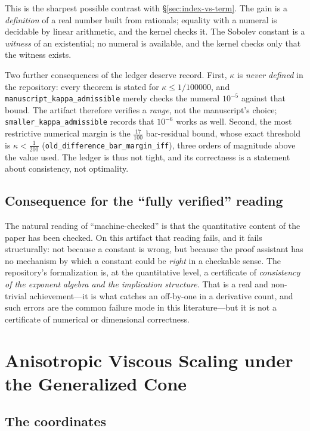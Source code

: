 \documentclass[11pt]{article}
\newcommand{\ct}[1]{\texttt{#1}}
\theoremstyle{plain}
\theoremstyle{definition}
\theoremstyle{remark}
\begin{document}
This is the sharpest possible contrast with \S\ref{sec:index-vs-term}. The gain
is a \emph{definition} of a real number built from rationals; equality with a
numeral is decidable by linear arithmetic, and the kernel checks it. The Sobolev
constant is a \emph{witness} of an existential; no numeral is available, and the
kernel checks only that the witness exists.

Two further consequences of the ledger deserve record. First, $\kappa$ is
\emph{never defined} in the repository: every theorem is stated for
$\kappa\le1/100000$, and \ct{manuscript\_kappa\_admissible} merely checks the
numeral $10^{-5}$ against that bound. The artifact therefore verifies a
\emph{range}, not the manuscript's choice; \ct{smaller\_kappa\_admissible}
records that $10^{-6}$ works as well. Second, the most restrictive numerical
margin is the $\tfrac{17}{100}$ bar-residual bound, whose exact threshold is
$\kappa<\tfrac1{200}$ (\ct{old\_difference\_bar\_margin\_iff}), three orders of
magnitude above the value used. The ledger is thus not tight, and its
correctness is a statement about consistency, not optimality.

\subsection{Consequence for the ``fully verified'' reading}

The natural reading of ``machine-checked'' is that the quantitative content of
the paper has been checked. On this artifact that reading fails, and it fails
structurally: not because a constant is wrong, but because the proof assistant
has no mechanism by which a constant could be \emph{right} in a checkable sense.
The repository's formalization is, at the quantitative level, a certificate of
\emph{consistency of the exponent algebra and the implication structure}. That is
a real and non-trivial achievement---it is what catches an off-by-one in a
derivative count, and such errors are the common failure mode in this
literature---but it is not a certificate of numerical or dimensional
correctness.

\section{Anisotropic Viscous Scaling under the Generalized Cone}
\label{sec:anisotropy}

\subsection{The coordinates}
\end{document}
